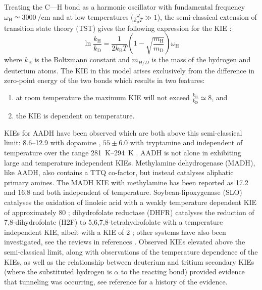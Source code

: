 Treating the C---H bond as a harmonic oscillator with fundamental frequency $\omega_{\mathrm{H}} \simeq \SI{3000}{\per\centi\meter}$ and at low temperatures ($\frac{\omega}{k_{\mathrm{B}}T} \gg 1$), the semi-classical extension of transition state theory (TST) gives the following expression for the KIE \cite{antoniouLargeKineticIsotope1997}:
\begin{equation}\label{eqn:tst_kie}
\ln \frac{k_{\mathrm{H}}}{k_{\mathrm{D}}}=\frac{1}{2k_{\mathrm{B}}T}\left(1-\sqrt{\frac{m_{\mathrm{H}}}{m_{\mathrm{D}}}}\right) \omega_{\mathrm{H}}
\end{equation}
where $k_{\mathrm{B}}$ is the Boltzmann constant and $m_{H/D}$ is the mass of the hydrogen and deuterium atoms. The KIE in this model arises exclusively from the difference in zero-point energy of the two bonds which results in two features:
\begin{enumerate}
    \item at room temperature the maximum KIE will not exceed $\frac{k_{\mathrm{H}}}{k_{\mathrm{D}}} \simeq 8$, and 
    \item the KIE is dependent on temperature. 
\end{enumerate}
KIEs for AADH have been observed which are both above this semi-classical limit:  \numrange[range-phrase=\text{--}]{8.6}{12.9} with dopamine \cite{basranImportanceBarrierShape2001a, hyunUnusuallyLargeIsotope1995a},  $\num{55}\pm\num{6.0}$ with tryptamine \cite{masgrauAtomicDescriptionEnzyme2006} and independent of temperature over the range \SIrange[range-phrase=\text{--}]{281}{294}{\kelvin} \cite{masgrauAtomicDescriptionEnzyme2006}. AADH is not alone in exhibiting large and temperature independent KIEs. Methylamine dehydrogenase (MADH), like AADH, also contains a TTQ co-factor, but instead catalyses aliphatic primary amines. The MADH KIE with methylamine has been reported as \num{17.2} \cite{brooksDeuteriumKineticIsotope1993} and \num{16.8} 
\cite{basranEnzymaticHTransferRequires1999} and both independent of temperature.  Soybean-lipoxygenase (SLO) catalyses the oxidation of linoleic acid with a weakly temperature dependent KIE of approximately \num{80} \cite{glickmanExtremelyLargeIsotope1994, knappTemperatureDependentIsotopeEffects2002}; dihydrofolate reductase (DHFR) catalyses the reduction of 7,8-dihydrofolate
(H2F) to 5,6,7,8-tetrahydrofolate with a temperature independent KIE, albeit with a KIE of  \num{2} \cite{sikorskiTunnelingCoupledMotion2004, loveridgeSolventEffectsCatalysis2010a}; other systems have also been investigated, see the reviews in references \cite{klinmanHydrogenTunnelingLinks2013, puMultidimensionalTunnelingRecrossing2006}.  Observed KIEs elevated above the semi-classical limit, along with observations of the temperature dependence of the KIEs, as well as the relationship between deuterium and tritium secondary KIEs (where the substituted hydrogen is $\alpha$ to the reacting bond) provided evidence that tunneling was occurring, see reference \cite{klinmanbeyond2009} for a history of the evidence. 

